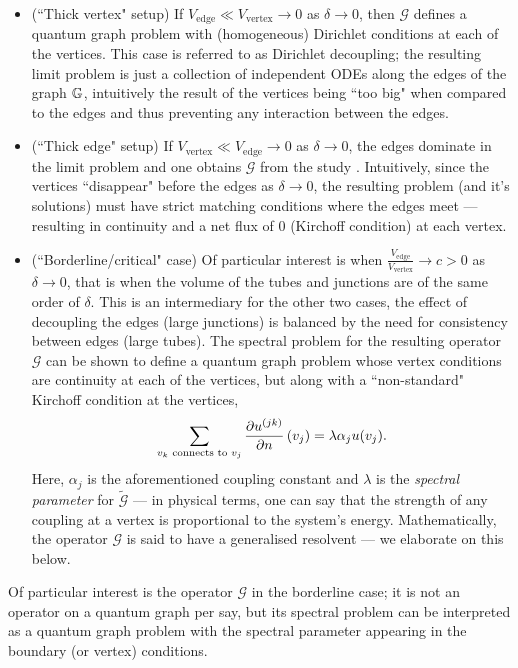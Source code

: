 \begin{itemize}
	\item (``Thick vertex" setup) If $V_{\mathrm{edge}}\ll V_{\mathrm{vertex}}\rightarrow0$ as $\delta\rightarrow0$, then $\mathcal{G}$ defines a quantum graph problem with (homogeneous) Dirichlet conditions at each of the vertices.
	This case is referred to as Dirichlet decoupling; the resulting limit problem is just a collection of independent ODEs along the edges of the graph $\mathbb{G}$, intuitively the result of the vertices being ``too big" when compared to the edges and thus preventing any interaction between the edges.
	\item (``Thick edge" setup) If $V_{\mathrm{vertex}}\ll V_{\mathrm{edge}}\rightarrow0$ as $\delta\rightarrow0$, the edges dominate in the limit problem and one obtains $\mathcal{G}$ from the study \cite{kuchment2001convergence}.
	Intuitively, since the vertices ``disappear" before the edges as $\delta\rightarrow0$, the resulting problem (and it's solutions) must have strict matching conditions where the edges meet --- resulting in continuity and a net flux of 0 (Kirchoff condition) at each vertex.
	\item (``Borderline/critical" case) Of particular interest is when $\frac{V_{\mathrm{edge}}}{V_{\mathrm{vertex}}}\rightarrow c>0$ as $\delta\rightarrow0$, that is when the volume of the tubes and junctions are of the same order of $\delta$.
	This is an intermediary for the other two cases, the effect of decoupling the edges (large junctions) is balanced by the need for consistency between edges (large tubes).
	The spectral problem for the resulting operator $\mathcal{G}$ can be shown to define a quantum graph problem whose vertex conditions are continuity at each of the vertices, but along with a ``non-standard" Kirchoff condition at the vertices, 
	\begin{align*}
	\sum_{v_k \text{ connects to } v_j} 
	\dfrac{\partial u^{(jk)}}{\partial n}\left( v_j \right) = \lambda\alpha_j u(v_j).
	\end{align*}
	Here, $\alpha_j$ is the aforementioned coupling constant and $\lambda$ is the \emph{spectral parameter} for $\tilde{\mathcal{G}}$ --- in physical terms, one can say that the strength of any coupling at a vertex is proportional to the system's energy.
	Mathematically, the operator $\mathcal{G}$ is said to have a generalised resolvent --- we elaborate on this below.
\end{itemize}
Of particular interest is the operator $\mathcal{G}$ in the borderline case; it is not an operator on a quantum graph per say, but its spectral problem can be interpreted as a quantum graph problem with the spectral parameter appearing in the boundary (or vertex) conditions.
